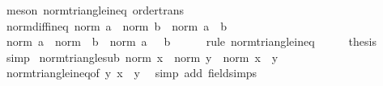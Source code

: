 \begin{isabellebody}
\ {\isacharparenleft}{\kern0pt}meson\ norm{\isacharunderscore}{\kern0pt}triangle{\isacharunderscore}{\kern0pt}ineq{}\ order{\isacharunderscore}{\kern0pt}trans{\isacharparenright}{\kern0pt}%
\endisatagproof
{\isafoldproof}%
%
\isadelimproof
\isanewline
%
\endisadelimproof
\isanewline
{}\isamarkupfalse%
\ norm{\isacharunderscore}{\kern0pt}diff{\isacharunderscore}{\kern0pt}ineq{\isacharcolon}{\kern0pt}\ {\isachardoublequoteopen}norm\ a\ {\isacharminus}{\kern0pt}\ norm\ b\ {\isasymle}\ norm\ {\isacharparenleft}{\kern0pt}a\ {\isacharplus}{\kern0pt}\ b{\isacharparenright}{\kern0pt}{\isachardoublequoteclose}\isanewline
%
\isadelimproof
%
\endisadelimproof
%
\isatagproof
{}\isamarkupfalse%
\ {\isacharminus}{\kern0pt}\isanewline
\ \ \isamarkupfalse%
\ {\isachardoublequoteopen}norm\ a\ {\isacharminus}{\kern0pt}\ norm\ {\isacharparenleft}{\kern0pt}{\isacharminus}{\kern0pt}\ b{\isacharparenright}{\kern0pt}\ {\isasymle}\ norm\ {\isacharparenleft}{\kern0pt}a\ {\isacharminus}{\kern0pt}\ {\isacharminus}{\kern0pt}\ b{\isacharparenright}{\kern0pt}{\isachardoublequoteclose}\isanewline
\ \ \ \ \isamarkupfalse%
\ {\isacharparenleft}{\kern0pt}rule\ norm{\isacharunderscore}{\kern0pt}triangle{\isacharunderscore}{\kern0pt}ineq{}{\isacharparenright}{\kern0pt}\isanewline
\ \ \isamarkupfalse%
\ \isamarkupfalse%
\ {\isacharquery}{\kern0pt}thesis\ \isamarkupfalse%
\ simp\isanewline
{}\isamarkupfalse%
%
\endisatagproof
{\isafoldproof}%
%
\isadelimproof
\isanewline
%
\endisadelimproof
\isanewline
{}\isamarkupfalse%
\ norm{\isacharunderscore}{\kern0pt}triangle{\isacharunderscore}{\kern0pt}sub{\isacharcolon}{\kern0pt}\ {\isachardoublequoteopen}norm\ x\ {\isasymle}\ norm\ y\ {\isacharplus}{\kern0pt}\ norm\ {\isacharparenleft}{\kern0pt}x\ {\isacharminus}{\kern0pt}\ y{\isacharparenright}{\kern0pt}{\isachardoublequoteclose}\isanewline
%
\isadelimproof
\ \ %
\endisadelimproof
%
\isatagproof
{}\isamarkupfalse%
\ norm{\isacharunderscore}{\kern0pt}triangle{\isacharunderscore}{\kern0pt}ineq{\isacharbrackleft}{\kern0pt}of\ {\isachardoublequoteopen}y{\isachardoublequoteclose}\ {\isachardoublequoteopen}x\ {\isacharminus}{\kern0pt}\ y{\isachardoublequoteclose}{\isacharbrackright}{\kern0pt}\ \isamarkupfalse%
\ {\isacharparenleft}{\kern0pt}simp\ add{\isacharcolon}{\kern0pt}\ field{\isacharunderscore}{\kern0pt}simps{\isacharparenright}{\kern0pt}%
\endisatagproof
{\isafoldproof}%
%
\isadelimproof
\isanewline
%

\end{isabellebody}
